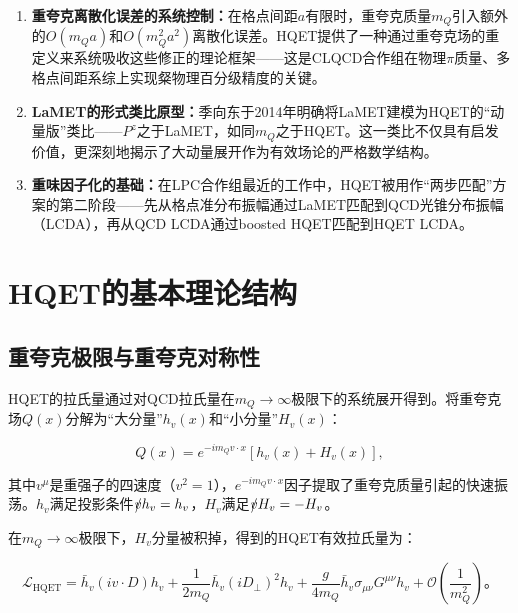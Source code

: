 \documentclass[12pt,a4paper]{ctexart}
\theoremstyle{definition}
\begin{document}
\begin{enumerate}
    \item \textbf{重夸克离散化误差的系统控制：}在格点间距$a$有限时，重夸克质量$m_Q$引入额外的$O(m_Q a)$和$O(m^2_Q a^2)$离散化误差。HQET提供了一种通过重夸克场的重定义来系统吸收这些修正的理论框架——这是CLQCD合作组在物理$\pi$质量、多格点间距系综上实现粲物理百分级精度的关键。

    \item \textbf{LaMET的形式类比原型：}季向东于2014年明确将LaMET建模为HQET的``动量版''类比——$P^z$之于LaMET，如同$m_Q$之于HQET。这一类比不仅具有启发价值，更深刻地揭示了大动量展开作为有效场论的严格数学结构。

    \item \textbf{重味因子化的基础：}在LPC合作组最近的工作中，HQET被用作``两步匹配''方案的第二阶段——先从格点准分布振幅通过LaMET匹配到QCD光锥分布振幅（LCDA），再从QCD LCDA通过boosted HQET匹配到HQET LCDA。
\end{enumerate}

\section{HQET的基本理论结构}

\subsection{重夸克极限与重夸克对称性}

HQET的拉氏量通过对QCD拉氏量在$m_Q \to \infty$极限下的系统展开得到。将重夸克场$Q(x)$分解为``大分量''$h_v(x)$和``小分量''$H_v(x)$：

\begin{equation}
Q(x) = e^{-im_Q v\cdot x} [h_v(x) + H_v(x)],
\label{eq:heavy_quark_decomp}
\end{equation}

其中$v^\mu$是重强子的四速度（$v^2 = 1$），$e^{-im_Q v\cdot x}$因子提取了重夸克质量引起的快速振荡。$h_v$满足投影条件$\slashed{v} h_v = h_v$，$H_v$满足$\slashed{v} H_v = -H_v$。

在$m_Q \to \infty$极限下，$H_v$分量被积掉，得到的HQET有效拉氏量为\cite{Ji2014LaMET}：

\begin{equation}
\mathcal{L}_{\text{HQET}} = \bar{h}_v (iv \cdot D) h_v + \frac{1}{2m_Q} \bar{h}_v (iD_\perp)^2 h_v + \frac{g}{4m_Q} \bar{h}_v \sigma_{\mu\nu} G^{\mu\nu} h_v + \mathcal{O}\left(\frac{1}{m_Q^2}\right)。
\label{eq:HQET_lagrangian}
\end{equation}
\end{document}
